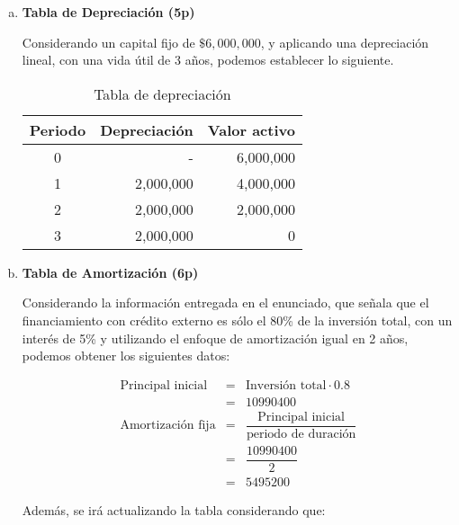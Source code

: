 \begin{enumerate}[(a)]
    \item {\bf Tabla de Depreciación (5p)}


          Considerando un capital fijo de $\$6,000,000$,
          y aplicando una depreciación lineal,
          con una vida útil de 3 años, podemos establecer lo siguiente.

          \begin{table}[h!t]
            \centering
            \begin{tabular}{|c|r|r|}
                \hline
                {\bf Periodo} & {\bf Depreciación} & {\bf Valor activo} \\\hline
                0 & - & 6,000,000 \\\hline
                1 & 2,000,000  & 4,000,000  \\\hline
                2 & 2,000,000  & 2,000,000  \\\hline
                3 & 2,000,000  & 0  \\\hline
            \end{tabular}
            \caption{Tabla de depreciación}
            \label{tab:depreciacion}  
          \end{table}

\newpage
    \item {\bf Tabla de Amortización (6p)}


        Considerando la información entregada en el enunciado,
        que señala que el financiamiento con crédito externo
        es sólo el 80\% de la inversión total,  con un interés de 5\%
        y utilizando el enfoque de amortización igual en 2 años,
        podemos obtener los siguientes datos:

        \begin{eqnarray}
            \text{Principal inicial} &=& \text{Inversión total}\cdot 0.8 \\
                                     &=& 10990400 \nonumber \\
            \text{Amortización fija} &=& \dfrac{\text{Principal inicial}}{\text{periodo de duración}} \\
                                     &=& \dfrac{10990400}{2} \nonumber \\
                                     &=& 5495200 \nonumber 
        \end{eqnarray}

        Además, se irá actualizando la tabla considerando que:


\end{enumerate}
